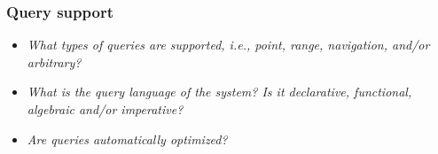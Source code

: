 
\begin{frame}
\frametitle{Query support}
\begin{itemize}
\item \emph{What types of queries are supported, i.e., point, range, navigation, and/or arbitrary?}
\item \emph{What is the query language of the system? Is it declarative, functional, algebraic and/or imperative?}
\item \emph{Are queries automatically optimized?}
\end{itemize}
\end{frame} 